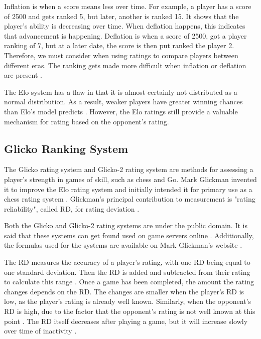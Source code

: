 		
		Inflation is when a score means less over time. For example, a player has a score of 2500 and gets ranked 5, but later, another is ranked 15. It shows that the player's ability is decreasing over time. When deflation happens, this indicates that advancement is happening. Deflation is when a score of 2500, got a player ranking of 7, but at a later date, the score is then put ranked the player 2. Therefore, we must consider when using ratings to compare players between different eras. The ranking gets made more difficult when inflation or deflation are present \cite{williams2013abstracting}. %
		
		The Elo system has a flaw in that it is almost certainly not distributed as a normal distribution. As a result, weaker players have greater winning chances than Elo's model predicts \cite{weng2011bayesian}. However, the Elo ratings still provide a valuable mechanism for rating based on the opponent's rating.
	
	\subsection{Glicko Ranking System}
		The Glicko rating system \cite{glickman1995glicko} and Glicko-2 rating system \cite{glickman2012example} are methods for assessing a player's strength in games of skill, such as chess and Go. Mark Glickman invented it to improve the Elo rating system and initially intended it for primary use as a chess rating system \cite{glickman1995glicko}. Glickman's principal contribution to measurement is "rating reliability", called RD, for rating deviation \cite{glickman1995glicko}.
		
		Both the Glicko and Glicko-2 rating systems are under the public domain. It is said that these systems can get found used on game servers online \cite{williams2013abstracting}. Additionally, the formulas used for the systems are available on Mark Glickman's website \cite{glickman_website}.
	
		The RD measures the accuracy of a player's rating, with one RD being equal to one standard deviation. Then the RD is added and subtracted from their rating to calculate this range \cite{glickman2012example}. Once a game has been completed, the amount the rating changes depends on the RD. The changes are smaller when the player's RD is low,  as the player's rating is already well known. Similarly, when the opponent's RD is high, due to the factor that the opponent's rating is not well known at this point \cite{glickman2012example}. The RD itself decreases after playing a game, but it will increase slowly over time of inactivity \cite{glickman2012example}.
	
